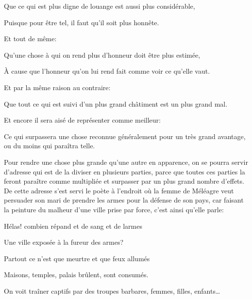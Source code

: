 \begin{lieu}
	Que ce qui est plus digne de louange est aussi plus considérable,
\end{lieu}

Puisque pour être tel, il faut qu'il soit plus honnête.

\bigbreak

Et tout de même:

\begin{lieu}
	Qu'une chose à qui on rend plus d'honneur doit être plus estimée,
\end{lieu}

À cause que l'honneur qu'on lui rend fait comme voir ce qu'elle vaut.

Et par la même raison au contraire:

\begin{lieu}
	Que tout ce qui est suivi d'un plus grand châtiment est un plus grand mal.
\end{lieu}

\bigbreak

Et encore il sera aisé de représenter comme meilleur:

\begin{lieu}
	Ce qui surpassera une chose reconnue généralement pour un très grand avantage, ou du moins qui paraîtra telle.
\end{lieu}

\bigbreak

Pour rendre une chose plus grande qu'une autre en apparence, on se pourra servir d'adresse qui est de la diviser en
plusieurs parties, parce que toutes ces parties la feront paraître comme multipliée et surpasser par un plus grand
nombre d'effets. De cette adresse s'est servi le poète à l'endroit où la femme de Méléagre veut persuader son mari de
prendre les armes pour la défense de son pays, car faisant la peinture du malheur d'une ville prise par force, c'est
ainsi qu'elle parle:

\begin{emphpar}
  Hélas! combien répand et de sang et de larmes

  Une ville exposée à la fureur des armes?

  Partout ce n'est que meurtre et que feux allumés

  Maisons, temples, palais brûlent, sont consumés.

  On voit traîner captifs par des troupes barbares, femmes, filles, enfants\dots
\end{emphpar}

